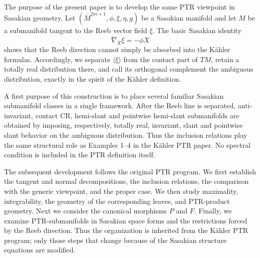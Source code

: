 \documentclass[11pt]{article}
\theoremstyle{definition}\newtheorem{definition}[theorem]{Definition}\newtheorem{example}[theorem]{Example}
\theoremstyle{remark}\newtheorem{remark}[theorem]{Remark}
\newcommand{\Mbar}{\overline M}\newcommand{\Dperp}{\mathcal D^{\perp}}\newcommand{\Dtilde}{\widetilde{\mathcal D}}
\begin{document}
The purpose of the present paper is to develop the same PTR viewpoint in
Sasakian geometry.  Let
\((\Mbar^{2m+1},\phi,\xi,\eta,g)\) be a Sasakian manifold and let \(M\)
be a submanifold tangent to the Reeb vector field \(\xi\).  The basic
Sasakian identity
\begin{equation}\label{eq:reeb}
 \widetilde\nabla_X\xi=-\phi X
\end{equation}
shows that the Reeb direction cannot simply be absorbed into the
K\"ahler formulas.  Accordingly, we separate
\(\langle\xi\rangle\) from the contact part of \(TM\), retain a totally
real distribution there, and call its orthogonal complement the ambiguous
distribution, exactly in the spirit of the K\"ahler definition.

A first purpose of this construction is to place several familiar
Sasakian submanifold classes in a single framework.  After the Reeb line
is separated, anti-invariant, contact CR, hemi-slant and pointwise
hemi-slant submanifolds are obtained by imposing, respectively, totally
real, invariant, slant and pointwise slant behavior on the ambiguous
distribution.  Thus the inclusion relations play the same structural role
as Examples 1--4 in the K\"ahler PTR paper.  No spectral condition is
included in the PTR definition itself.

The subsequent development follows the original PTR program.  We first
establish the tangent and normal decompositions, the inclusion relations,
the comparison with the generic viewpoint, and the proper case.  We then
study maximality, integrability, the geometry of the corresponding leaves,
and PTR-product geometry.  Next we consider the canonical morphisms \(P\)
and \(F\).  Finally, we examine PTR-submanifolds in Sasakian space forms
and the restrictions forced by the Reeb direction.  Thus the organization
is inherited from the K\"ahler PTR program; only those steps that change
because of the Sasakian structure equations are modified.
\end{document}
